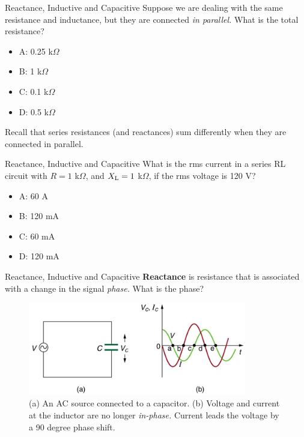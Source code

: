 \documentclass{beamer}
\begin{document}
\begin{frame}{Reactance, Inductive and Capacitive}
Suppose we are dealing with the same resistance and inductance, but they are connected \textit{in parallel.}  What is the total resistance?
\begin{itemize}
\item A: 0.25 k$\Omega$
\item B: 1 k$\Omega$
\item C: 0.1 k$\Omega$
\item D: 0.5 k$\Omega$
\end{itemize}
\footnotesize
Recall that series resistances (and reactances) sum differently when they are connected in parallel.
\end{frame}

\begin{frame}{Reactance, Inductive and Capacitive}
What is the rms current in a series RL circuit with $R = 1$ k$\Omega$, and $X_{\rm L} = 1$ k$\Omega$, if the rms voltage is 120 V?
\begin{itemize}
\item A: 60 A
\item B: 120 mA
\item C: 60 mA
\item D: 120 mA
\end{itemize}
\end{frame}

\begin{frame}{Reactance, Inductive and Capacitive}
\small
\textbf{\alert{Reactance}} is resistance that is associated with a change in the signal \textit{phase.}  What is the phase?
\begin{figure}
\centering
\includegraphics[width=0.85\textwidth]{figures/phase3.png}
\caption{\label{fig:phase3} (a) An AC source connected to a capacitor. (b) Voltage and current at the inductor are no longer \textit{in-phase.}  Current leads the voltage by a 90 degree phase shift.}
\end{figure}
\end{frame}
\end{document}

